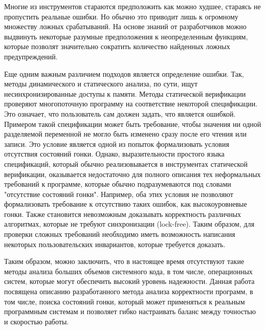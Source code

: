 Многие из инструментов стараются предположить как можно худшее, стараясь не пропустить реальные ошибки.
Но обычно это приводит лишь к огромному множеству ложных срабатываний.
На основе знаний от разработчиков можно выдвинуть некоторые разумные предположения к неопределенным функциям, которые позволят значительно сократить количество найденных ложных предупреждений.

Еще одним важным различием подходов является определение ошибки. 
Так, методы динамического и статического анализа, по сути, ищут несинхронизированные доступы к памяти.
Методы статической верификации проверяют многопоточную программу на соответствие некоторой спецификации.
Это означает, что пользователь сам должен задать, что является ошибкой.
Примером такой спецификации может быть требование, чтобы значения ни одной разделяемой переменной не могло быть изменено сразу после его чтения или записи.
Это условие является одной из попыток формализовать условия отсутствия состояний гонки.
Однако, выразительности простого языка спецификаций, который обычно реализовывается в инструментах статической верификации, оказывается недостаточно для полного описания тех неформальных требований к программе, которые обычно подразумеваются под словами "отсутствие состояний гонки".
Например, оба этих условия не позволяют формализовать требование к отсутствию таких ошибок, как высокоуровневые гонки.
Также становится невозможным доказывать корректность различных алгоритмах, которые не требуют синхронизации (lock-free).
Таким образом, для проверки сложных требований необходимо иметь возможность написания некоторых пользовательских инвариантов, которые требуется доказать.

Таким образом, можно заключить, что в настоящее время отсутствуют такие методы анализа больших объемов системного кода, в том числе, операционных систем, которые могут обеспечить высокий уровень надежности.
Данная работа посвящена описанию разработанного метода анализа корректности программ, в том числе, поиска состояний гонки, который может применяться к реальным программным системам и позволяет гибко настраивать баланс между точностью и скоростью работы.
